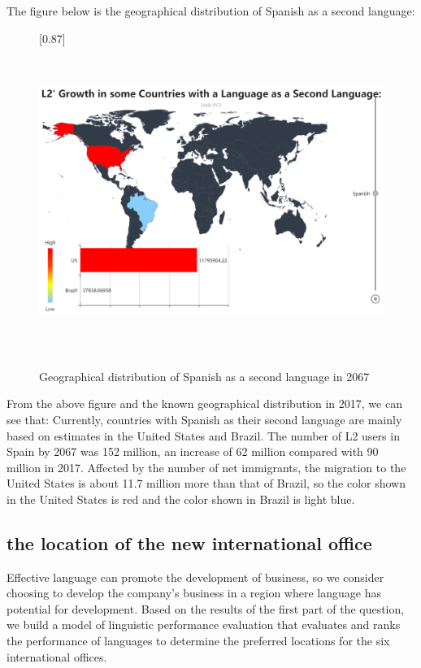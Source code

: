 \par The figure below is the geographical distribution of Spanish as a second language:

\begin{figure}[H]
	\centering
	 \scalebox{0.87}[0.87]{%
	\includegraphics[width=1\linewidth,height=10cm]{figures/Spanish}
}
	\caption{Geographical distribution of Spanish as a second language in 2067}
	\label{fig:spanish}
\end{figure}

\par From the above figure and the known geographical distribution in 2017, we can see that: Currently, countries with Spanish as their second language are mainly based on estimates in the United States and Brazil. The number of L2 users in Spain by 2067 was 152 million, an increase of 62 million compared with 90 million in 2017. Affected by the number of net immigrants, the migration to the United States is about 11.7 million more than that of Brazil, so the color shown in the United States is red and the color shown in Brazil is light blue. 

\subsection{the location of the new international office}

\noindent Effective language can promote the development of business, so we consider choosing to develop the company's business in a region where language has potential for development. Based on the results of the first part of the question, we build a model of linguistic performance evaluation that evaluates and ranks the performance of languages to determine the preferred locations for the six international offices.

